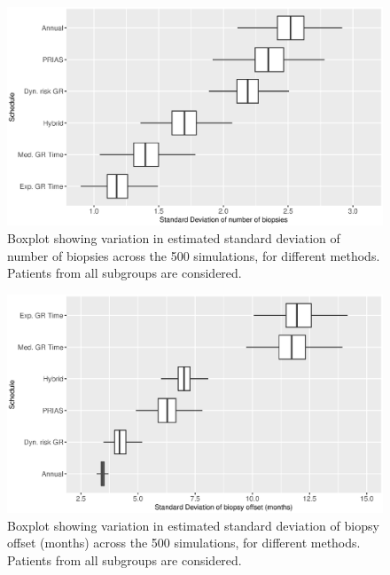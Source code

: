 \begin{figure}[!htb]
\centerline{\includegraphics[width=\columnwidth]{images/sim_study/nbSDBoxPlot_all.eps}}
\caption{Boxplot showing variation in estimated standard deviation of number of biopsies across the 500 simulations, for different methods. Patients from all subgroups are considered.}
\label{fig : nbSDBoxPlot_all}
\end{figure}

\begin{figure}[!htb]
\centerline{\includegraphics[width=\columnwidth]{images/sim_study/offsetSDBoxPlot_all.eps}}
\caption{Boxplot showing variation in estimated standard deviation of biopsy offset (months) across the 500 simulations, for different methods. Patients from all subgroups are considered.}
\label{fig : offsetSDBoxPlot_all}
\end{figure}



